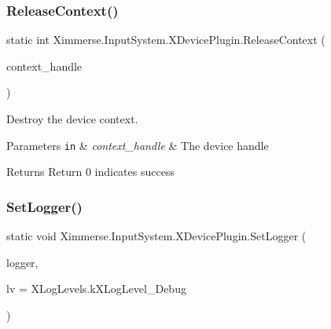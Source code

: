 \subsubsection{\texorpdfstring{Release\+Context()}{ReleaseContext()}}
{\footnotesize\ttfamily static int Ximmerse.\+Input\+System.\+X\+Device\+Plugin.\+Release\+Context (\begin{DoxyParamCaption}\item[{\mbox{\hyperlink{class_ximmerse_1_1_input_system_1_1_x_device_plugin_1_1_x_handle}{X\+Handle}}}]{context\+\_\+handle }\end{DoxyParamCaption})\hspace{0.3cm}{\ttfamily [static]}}



Destroy the device context. 


\begin{DoxyParams}[1]{Parameters}
\mbox{\tt in}  & {\em context\+\_\+handle} & The device handle \\
\hline
\end{DoxyParams}
\begin{DoxyReturn}{Returns}
Return 0 indicates success 
\end{DoxyReturn}
\mbox{\label{class_ximmerse_1_1_input_system_1_1_x_device_plugin_a95d719f976001f91b79be34041aaeb43}} 
\subsubsection{\texorpdfstring{Set\+Logger()}{SetLogger()}}
{\footnotesize\ttfamily static void Ximmerse.\+Input\+System.\+X\+Device\+Plugin.\+Set\+Logger (\begin{DoxyParamCaption}\item[{\mbox{\hyperlink{class_ximmerse_1_1_input_system_1_1_x_device_plugin_ad3e594d2625a689603878102ad019899}{X\+Log\+Delegate}}}]{logger,  }\item[{X\+Log\+Levels}]{lv = {\ttfamily XLogLevels.kXLogLevel\+\_\+Debug} }\end{DoxyParamCaption})\hspace{0.3cm}{\ttfamily [static]}}



